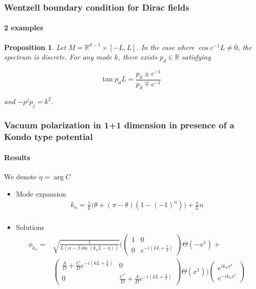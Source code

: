 \documentclass[french]{beamer}
\newtheorem{proposition}{Proposition}
\begin{document}
\begin{frame}
\frametitle{Wentzell boundary condition for Dirac fields}
\framesubtitle{2 examples}

\begin{proposition}
Let ${M} = \mathbb{R}^{d-1} \times [-L, L]$.
In the case where $\cos c^{-1}L \neq 0$,
the spectrum is discrete.
For any mode $k$, there exists $p_d\in \mathbb{R}$ 
satisfying 

\begin{equation*}
\tan p_d L = \frac{p_d \pm c^{-1}}{p_d \mp c^{-1}}
\end{equation*}

and $-p^jp_j = k^2$.
\end{proposition}


\end{frame}
\begin{frame}[shrink=10]
\frametitle{Vacuum polarization in 1+1 dimension in presence of a Kondo type potential}
\framesubtitle{Results}

We denote $\eta = \arg C$

\begin{itemize}

\item Mode expansion
\begin{equation*}
\begin{split}
k_{n} = \frac{1}{L} \big(\theta + (\pi - \theta)(1- (-1)^n)\big) + \frac{\pi}{L}n \\
\end{split}
\end{equation*}


\item Solutions
\begin{equation*}
\begin{split}
\phi_{k_{n}} = 
& \sqrt{\frac{1}{L(\alpha - \beta \sin (k_{n}L - \eta))}} \Bigg( 
\begin{pmatrix}
1 & 0 \\
0  & e^{-i(kL + \frac{\pi}{2})}
\end{pmatrix}
\Theta(-x^1) + \\
& \begin{pmatrix}
\frac{A}{D}  +  \frac{C}{D} e^{-i(kL + \frac{\pi}{2})} & 0 \\
0  & \frac{C^*}{D}  + \frac{A}{D}e^{-i(kL + \frac{\pi}{2})}
\end{pmatrix}\Theta(x^1)\Bigg)
\begin{pmatrix}
e^{ik_{n} x^1} \\
e^{- ik_{n} x^1}
\end{pmatrix}
\end{split}
\end{equation*}


\end{itemize}

\end{frame}

\end{document}
